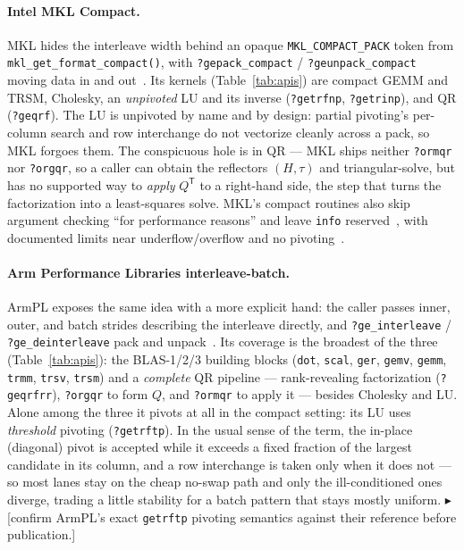 \documentclass[11pt]{article}
\newif\ifdraftmode \draftmodetrue
\newcommand{\draftnote}[1]{\ifdraftmode{\textcolor{orange!85!black}{\small$\blacktriangleright$\,\textsf{[#1]}}}\fi}
\newcommand{\code}[1]{\texttt{#1}}
\begin{document}
\paragraph{Intel MKL Compact.}
MKL hides the interleave width behind an opaque \code{MKL\_COMPACT\_PACK} token
from \code{mkl\_get\_format\_compact()}, with \code{?gepack\_compact} /
\code{?geunpack\_compact} moving data in and out~\cite{mkl-compact}. Its kernels
(Table~\ref{tab:apis}) are compact GEMM and TRSM, Cholesky, an \emph{unpivoted}
LU and its inverse (\code{?getrfnp}, \code{?getrinp}), and QR (\code{?geqrf}). The
LU is unpivoted by name and by design: partial pivoting's per-column search and
row interchange do not vectorize cleanly across a pack, so MKL forgoes them. The
conspicuous hole is in QR --- MKL ships neither \code{?ormqr} nor \code{?orgqr},
so a caller can obtain the reflectors $(H,\tau)$ and triangular-solve, but has no
supported way to \emph{apply} $Q^{\mathsf T}$ to a right-hand side, the step that
turns the factorization into a least-squares solve. MKL's compact routines also
skip argument checking ``for performance reasons'' and leave \code{info}
reserved~\cite{mkl-compact}, with documented limits near underflow/overflow and
no pivoting~\cite{mkl-compact-limits}.

\paragraph{Arm Performance Libraries interleave-batch.}
ArmPL exposes the same idea with a more explicit hand: the caller passes inner,
outer, and batch strides describing the interleave directly, and
\code{?ge\_interleave} / \code{?ge\_deinterleave} pack and unpack~\cite{armpl-interleave}.
Its coverage is the broadest of the three (Table~\ref{tab:apis}): the BLAS-1/2/3
building blocks (\code{dot}, \code{scal}, \code{ger}, \code{gemv}, \code{gemm},
\code{trmm}, \code{trsv}, \code{trsm}) and a \emph{complete} QR pipeline ---
rank-revealing factorization (\code{?geqrfrr}), \code{?orgqr} to form $Q$, and
\code{?ormqr} to apply it --- besides Cholesky and LU. Alone among the three it
pivots at all in the compact setting: its LU uses \emph{threshold} pivoting
(\code{?getrftp}). In the usual sense of the term, the in-place (diagonal) pivot
is accepted while it exceeds a fixed fraction of the largest candidate in its
column, and a row interchange is taken only when it does not --- so most lanes
stay on the cheap no-swap path and only the ill-conditioned ones diverge, trading
a little stability for a batch pattern that stays mostly uniform.
\draftnote{confirm ArmPL's exact \code{getrftp} pivoting semantics against their
reference before publication.}
\end{document}
